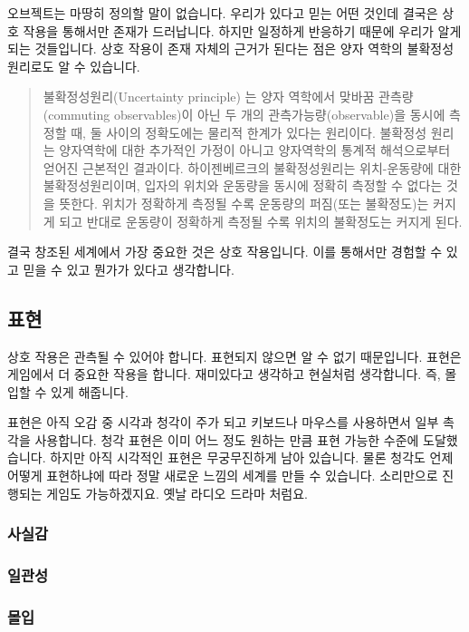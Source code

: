 \documentclass[chapter,kosection, 10.5pt, romanfixed, a4paper]{oblivoir}
\newenvironment{smallquote}
{\begin{quote}\small} {\end{quote}}
\begin{document}
오브젝트는 마땅히 정의할 말이 없습니다. 우리가 있다고 믿는 어떤 것인데 결국은 상호 작용을 
통해서만 존재가 드러납니다. 하지만 일정하게 반응하기 때문에 우리가 알게 되는 것들입니다. 
상호 작용이 존재 자체의 근거가 된다는 점은 양자 역학의 불확정성 원리로도 알 수 있습니다. 

\begin{smallquote}
불확정성원리(Uncertainty principle) 는 양자 역학에서 맞바꿈 관측량(commuting observables)이 아닌 두 개의 
관측가능량(observable)을 동시에 측정할 때, 둘 사이의 정확도에는 물리적 한계가 있다는 원리이다. 
불확정성 원리는 양자역학에 대한 추가적인 가정이 아니고 양자역학의 통계적 해석으로부터 얻어진 근본적인 결과이다. 
하이젠베르크의 불확정성원리는 위치-운동량에 대한 불확정성원리이며, 입자의 위치와 운동량을 동시에 정확히 
측정할 수 없다는 것을 뜻한다. 위치가 정확하게 측정될 수록 운동량의 퍼짐(또는 불확정도)는 커지게 되고 
반대로 운동량이 정확하게 측정될 수록 위치의 불확정도는 커지게 된다.
\end{smallquote}

결국 창조된 세계에서 가장 중요한 것은 상호 작용입니다. 이를 통해서만 경험할 수 있고 믿을 수 있고 
뭔가가 있다고 생각합니다. 

\subsection{표현}

상호 작용은 관측될 수 있어야 합니다. 표현되지 않으면 알 수 없기 때문입니다. 표현은 게임에서 
더 중요한 작용을 합니다. 재미있다고 생각하고 현실처럼 생각합니다. 즉, 몰입할 수 있게 해줍니다. 

표현은 아직 오감 중 시각과 청각이 주가 되고 키보드나 마우스를 사용하면서 일부 촉각을 사용합니다. 
청각 표현은 이미 어느 정도 원하는 만큼 표현 가능한 수준에 도달했습니다. 하지만 아직 시각적인 표현은 
무궁무진하게 남아 있습니다. 물론 청각도 언제 어떻게 표현하냐에 따라 정말 새로운 느낌의 세계를 
만들 수 있습니다. 소리만으로 진행되는 게임도 가능하겠지요. 옛날 라디오 드라마 처럼요. 

\subsubsection{사실감}

\subsubsection{일관성}

\subsubsection{몰입}
\end{document}
